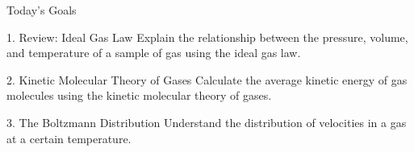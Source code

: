\documentclass[10pt]{beamer}
\begin{document}
\begin{frame}{Today's Goals}


      \begin{exampleblock}{1. Review: Ideal Gas Law}
        Explain the relationship between the pressure, volume, and temperature of a sample of gas using the ideal gas law.
      \end{exampleblock}
      
      \begin{block}{2. Kinetic Molecular Theory of Gases}
        Calculate the average kinetic energy of gas molecules using the kinetic molecular theory of gases.
      \end{block}

      \begin{block}{3. The Boltzmann Distribution}
        Understand the distribution of velocities in a gas at a certain temperature.
      \end{block}

\end{frame}
\end{document}
